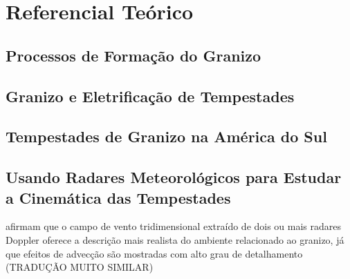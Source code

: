 \chapter{Referencial Teórico}\label{teoria}

\section{Processos de Formação do Granizo}

\section{Granizo e Eletrificação de Tempestades}\label{granizo_eletrificacao}

\section{Tempestades de Granizo na América do Sul}

\section{Usando Radares Meteorológicos para Estudar a Cinemática das Tempestades}

 afirmam que o campo de vento tridimensional extraído de dois ou mais radares Doppler oferece a descrição mais realista do ambiente relacionado ao granizo, já que efeitos de advecção são mostradas com alto grau de detalhamento (TRADUÇÃO MUITO SIMILAR)